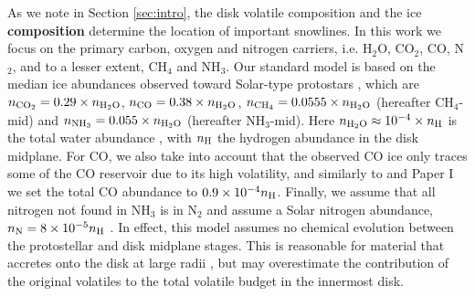 \documentclass[apj]{emulateapj}
\begin{document}
As we note in Section \ref{sec:intro}, the disk volatile composition and the ice \textbf{composition} determine the location of important snowlines. In this work we focus on the primary carbon, oxygen and nitrogen carriers, i.e. H$_2$O, CO$_2$, CO, N$_2$, and to a lesser extent, CH$_4$ and NH$_3$. %
Our standard model is based on the median ice abundances observed toward Solar-type protostars \citep{oberg11a}, which are $n_{\rm CO_2}=0.29 \times n_{\rm H_2O}$, $n_{\rm CO}=0.38 \times n_{\rm H_2O}$, $n_{\rm CH_4}=0.0555 \times n_{\rm H_2O}$ (hereafter CH$_4$-mid) and $n_{\rm NH_3}=0.055 \times n_{\rm H_2O}$ (hereafter NH$_3$-mid). Here $n_{\rm H_2O} \approx 10^{-4} \times n_{\rm H}$ is the total water abundance \citep{vandishoeck06}, with $n_{\rm H}$ the hydrogen abundance in the disk midplane. For CO, we also take into account that the observed CO ice only traces some of the CO reservoir due to its high volatility, and similarly to \citet{oberg11} and Paper I we set the total CO abundance to $0.9 \times 10^{-4} n_{\rm H}$. Finally, we assume that all nitrogen not found in NH$_3$ is in N$_2$ and assume a Solar nitrogen abundance, $n_{\rm N}=8 \times 10^{-5} n_{\rm H}$ \citep{lodders03}. In effect, this model assumes no chemical evolution between the protostellar and disk midplane stages. This is reasonable for material that accretes onto the disk at large radii \citep{visser09}, but may overestimate the contribution of the original volatiles to the total volatile budget in the innermost disk. 
\end{document}
